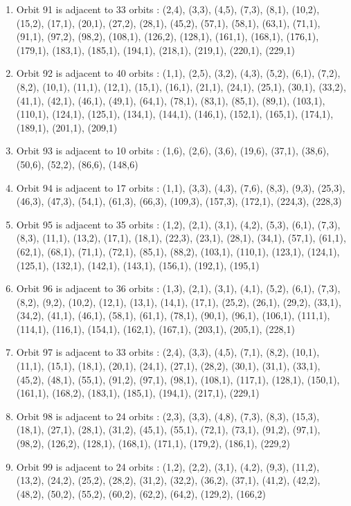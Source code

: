 \documentclass[12pt]{article}
\begin{document}
\begin{enumerate}
\item Orbit 91 is adjacent to 33 orbits : (2,4), (3,3), (4,5), (7,3), (8,1), (10,2), (15,2), (17,1), (20,1), (27,2), (28,1), (45,2), (57,1), (58,1), (63,1), (71,1), (91,1), (97,2), (98,2), (108,1), (126,2), (128,1), (161,1), (168,1), (176,1), (179,1), (183,1), (185,1), (194,1), (218,1), (219,1), (220,1), (229,1)
\item Orbit 92 is adjacent to 40 orbits : (1,1), (2,5), (3,2), (4,3), (5,2), (6,1), (7,2), (8,2), (10,1), (11,1), (12,1), (15,1), (16,1), (21,1), (24,1), (25,1), (30,1), (33,2), (41,1), (42,1), (46,1), (49,1), (64,1), (78,1), (83,1), (85,1), (89,1), (103,1), (110,1), (124,1), (125,1), (134,1), (144,1), (146,1), (152,1), (165,1), (174,1), (189,1), (201,1), (209,1)
\item Orbit 93 is adjacent to 10 orbits : (1,6), (2,6), (3,6), (19,6), (37,1), (38,6), (50,6), (52,2), (86,6), (148,6)
\item Orbit 94 is adjacent to 17 orbits : (1,1), (3,3), (4,3), (7,6), (8,3), (9,3), (25,3), (46,3), (47,3), (54,1), (61,3), (66,3), (109,3), (157,3), (172,1), (224,3), (228,3)
\item Orbit 95 is adjacent to 35 orbits : (1,2), (2,1), (3,1), (4,2), (5,3), (6,1), (7,3), (8,3), (11,1), (13,2), (17,1), (18,1), (22,3), (23,1), (28,1), (34,1), (57,1), (61,1), (62,1), (68,1), (71,1), (72,1), (85,1), (88,2), (103,1), (110,1), (123,1), (124,1), (125,1), (132,1), (142,1), (143,1), (156,1), (192,1), (195,1)
\item Orbit 96 is adjacent to 36 orbits : (1,3), (2,1), (3,1), (4,1), (5,2), (6,1), (7,3), (8,2), (9,2), (10,2), (12,1), (13,1), (14,1), (17,1), (25,2), (26,1), (29,2), (33,1), (34,2), (41,1), (46,1), (58,1), (61,1), (78,1), (90,1), (96,1), (106,1), (111,1), (114,1), (116,1), (154,1), (162,1), (167,1), (203,1), (205,1), (228,1)
\item Orbit 97 is adjacent to 33 orbits : (2,4), (3,3), (4,5), (7,1), (8,2), (10,1), (11,1), (15,1), (18,1), (20,1), (24,1), (27,1), (28,2), (30,1), (31,1), (33,1), (45,2), (48,1), (55,1), (91,2), (97,1), (98,1), (108,1), (117,1), (128,1), (150,1), (161,1), (168,2), (183,1), (185,1), (194,1), (217,1), (229,1)
\item Orbit 98 is adjacent to 24 orbits : (2,3), (3,3), (4,8), (7,3), (8,3), (15,3), (18,1), (27,1), (28,1), (31,2), (45,1), (55,1), (72,1), (73,1), (91,2), (97,1), (98,2), (126,2), (128,1), (168,1), (171,1), (179,2), (186,1), (229,2)
\item Orbit 99 is adjacent to 24 orbits : (1,2), (2,2), (3,1), (4,2), (9,3), (11,2), (13,2), (24,2), (25,2), (28,2), (31,2), (32,2), (36,2), (37,1), (41,2), (42,2), (48,2), (50,2), (55,2), (60,2), (62,2), (64,2), (129,2), (166,2)

\end{enumerate}
\end{document}

